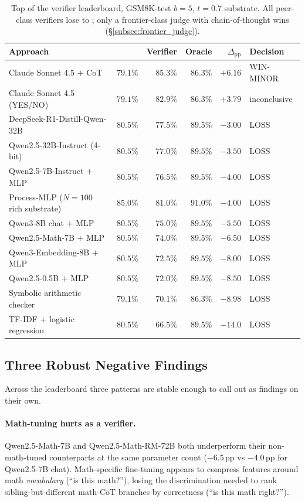 \begin{table}[h]
\centering
\caption{Top of the verifier leaderboard, GSM8K-test $b{=}5$,
$t{=}0.7$ \cmaj{} substrate.  All peer-class verifiers lose to
\cmaj{}; only a frontier-class judge with chain-of-thought wins
(\S\ref{subsec:frontier_judge}).}
\label{tab:verifier_top}
\smallskip
\small
\begin{tabular}{lrrrrl}
\toprule
Approach & \cmaj{} & Verifier & Oracle & $\Delta_\text{pp}$ & Decision \\
\midrule
Claude Sonnet 4.5 $+$ CoT & $79.1\%$ & $\mathbf{85.3\%}$ & $86.3\%$ & $\mathbf{+6.16}$ & WIN-MINOR \\
Claude Sonnet 4.5 (YES/NO) & $79.1\%$ & $82.9\%$ & $86.3\%$ & $+3.79$ & inconclusive \\
DeepSeek-R1-Distill-Qwen-32B & $80.5\%$ & $77.5\%$ & $89.5\%$ & $-3.00$ & LOSS \\
Qwen2.5-32B-Instruct (4-bit) & $80.5\%$ & $77.0\%$ & $89.5\%$ & $-3.50$ & LOSS \\
Qwen2.5-7B-Instruct $+$ MLP & $80.5\%$ & $76.5\%$ & $89.5\%$ & $-4.00$ & LOSS \\
Process-MLP ($N{=}100$ rich substrate) & $85.0\%$ & $81.0\%$ & $91.0\%$ & $-4.00$ & LOSS \\
Qwen3-8B chat $+$ MLP & $80.5\%$ & $75.0\%$ & $89.5\%$ & $-5.50$ & LOSS \\
Qwen2.5-Math-7B $+$ MLP & $80.5\%$ & $74.0\%$ & $89.5\%$ & $-6.50$ & LOSS \\
Qwen3-Embedding-8B $+$ MLP & $80.5\%$ & $72.5\%$ & $89.5\%$ & $-8.00$ & LOSS \\
Qwen2.5-0.5B $+$ MLP & $80.5\%$ & $72.0\%$ & $89.5\%$ & $-8.50$ & LOSS \\
Symbolic arithmetic checker & $79.1\%$ & $70.1\%$ & $86.3\%$ & $-8.98$ & LOSS \\
TF-IDF $+$ logistic regression & $80.5\%$ & $66.5\%$ & $89.5\%$ & $-14.0$ & LOSS \\
\bottomrule
\end{tabular}
\normalsize
\end{table}

\subsection{Three Robust Negative Findings}
\label{subsec:three_negatives}

Across the leaderboard three patterns are stable enough to call out
as findings on their own.

\paragraph{Math-tuning hurts as a verifier.}
Qwen2.5-Math-7B and Qwen2.5-Math-RM-72B both underperform their
non-math-tuned counterparts at the same parameter count ($-6.5$\,pp
vs $-4.0$\,pp for Qwen2.5-7B chat).  Math-specific fine-tuning
appears to compress features around math \emph{vocabulary} (``is
this math?''), losing the discrimination needed to rank
sibling-but-different math-CoT branches by correctness (``is this
math right?'').

